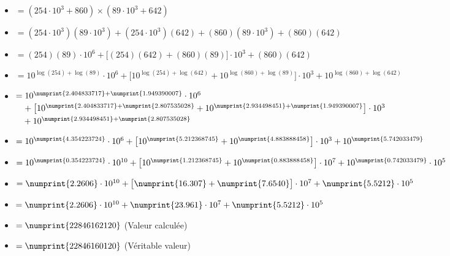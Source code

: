 \documentclass[a4paper, twoside]{article}
\begin{document}
\begin{itemize}
\begin{small}
\begin{itemize}
			\item[] $= (254 \cdot 10^{3} + 860) \times (89 \cdot 10^{3} + 642)$
			\vspace{0.1 cm}
			\item[] $= (254 \cdot 10^{3})(89 \cdot 10^{3}) + (254 \cdot 10^{3})(642) + (860)(89 \cdot 10^{3}) + (860)(642)$
			\vspace{0.1 cm}
			\item[] $= (254)(89)\cdot 10^{6} + \big[(254)(642) + (860)(89)\big] \cdot 10^{3} + (860)(642)$
			\vspace{0.1 cm}
			\item[] $= 10^{\log(254)+\log(89)} \cdot 10^{6} + \big[10^{\log(254)+\log(642)} + 10^{\log(860)+\log(89)}\big] \cdot 10^{3} + 10^{\log(860)+\log(642)}$
			\vspace{0.1 cm}
			\item[] $= 10^{\numprint{2.404833717}+\numprint{1.949390007}} \cdot 10^{6}$\\
			$\phantom{=} + \big[10^{\numprint{2.404833717}+\numprint{2.807535028}} + 10^{\numprint{2.934498451}+\numprint{1.949390007}}\big] \cdot 10^{3}$\\
			$\phantom{=} + 10^{\numprint{2.934498451}+\numprint{2.807535028}}$
			\vspace{0.1 cm}
			\item[] $= 10^{\numprint{4.354223724}} \cdot 10^{6} + \big[10^{\numprint{5.212368745}} + 10^{\numprint{4.883888458}}\big] \cdot 10^{3} + 10^{\numprint{5.742033479}}$
			\vspace{0.1 cm}
			\item[] $= 10^{\numprint{0.354223724}} \cdot 10^{10} + \big[10^{\numprint{1.212368745}} + 10^{\numprint{0.883888458}}\big] \cdot 10^{7} + 10^{\numprint{0.742033479}} \cdot 10^{5}$
			\vspace{0.1 cm}
			\item[] $= \numprint{2.2606} \cdot 10^{10} + \big[\numprint{16.307} + \numprint{7.6540}\big] \cdot 10^{7} + \numprint{5.5212} \cdot 10^{5}$
			\vspace{0.1 cm}
			\item[] $= \numprint{2.2606} \cdot 10^{10} + \numprint{23.961} \cdot 10^{7} + \numprint{5.5212} \cdot 10^{5}$
			\vspace{0.2 cm}
			\item[] $= \numprint{22846162120}$ (Valeur calculée)
			\vspace{0.1 cm}
			\item[] $= \numprint{22846160120}$ (Véritable valeur)\\
		\end{itemize}
		

\end{small}
\end{itemize}
\end{document}
